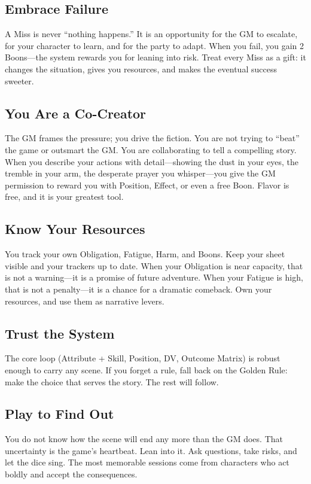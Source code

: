 \subsection{Embrace Failure}
A Miss is never ``nothing happens.'' It is an opportunity for the GM to escalate, for your character to learn, and for the party to adapt. When you fail, you gain 2 Boons---the system rewards you for leaning into risk. Treat every Miss as a gift: it changes the situation, gives you resources, and makes the eventual success sweeter.

\subsection{You Are a Co-Creator}
The GM frames the pressure; you drive the fiction. You are not trying to ``beat'' the game or outsmart the GM. You are collaborating to tell a compelling story. When you describe your actions with detail---showing the dust in your eyes, the tremble in your arm, the desperate prayer you whisper---you give the GM permission to reward you with Position, Effect, or even a free Boon. Flavor is free, and it is your greatest tool.

\subsection{Know Your Resources}
You track your own Obligation, Fatigue, Harm, and Boons. Keep your sheet visible and your trackers up to date. When your Obligation is near capacity, that is not a warning---it is a promise of future adventure. When your Fatigue is high, that is not a penalty---it is a chance for a dramatic comeback. Own your resources, and use them as narrative levers.

\subsection{Trust the System}
The core loop (Attribute + Skill, Position, DV, Outcome Matrix) is robust enough to carry any scene. If you forget a rule, fall back on the Golden Rule: make the choice that serves the story. The rest will follow.

\subsection{Play to Find Out}
You do not know how the scene will end any more than the GM does. That uncertainty is the game's heartbeat. Lean into it. Ask questions, take risks, and let the dice sing. The most memorable sessions come from characters who act boldly and accept the consequences.


